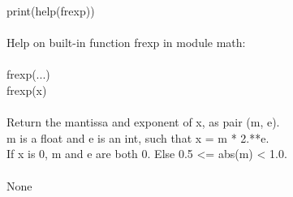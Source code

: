 \documentclass[12pt]{article}
\begin{document}
print(help(frexp))\\\\
Help on built-in function frexp in module math:\\\\
frexp(...)\\
    frexp(x)\\\\    
    Return the mantissa and exponent of x, as pair (m, e).\\
    m is a float and e is an int, such that x = m * 2.**e.\\
    If x is 0, m and e are both 0.  Else 0.5 <= abs(m) < 1.0.\\\\
None\\\\
\end{document}
